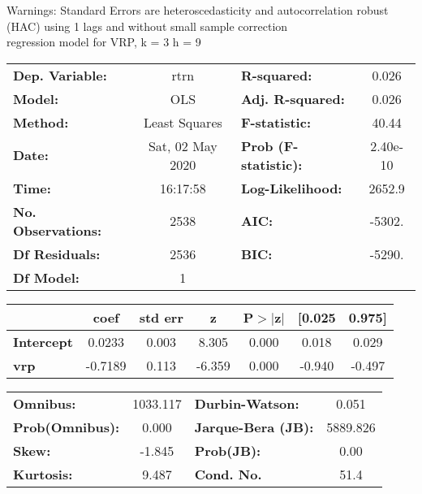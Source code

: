 Warnings: \newline
 [1] Standard Errors are heteroscedasticity and autocorrelation robust (HAC) using 1 lags and without small sample correction\\ 

regression model for VRP, k = 3 h = 9\begin{center}
\begin{tabular}{lclc}
\toprule
\textbf{Dep. Variable:}    &       rtrn       & \textbf{  R-squared:         } &     0.026   \\
\textbf{Model:}            &       OLS        & \textbf{  Adj. R-squared:    } &     0.026   \\
\textbf{Method:}           &  Least Squares   & \textbf{  F-statistic:       } &     40.44   \\
\textbf{Date:}             & Sat, 02 May 2020 & \textbf{  Prob (F-statistic):} &  2.40e-10   \\
\textbf{Time:}             &     16:17:58     & \textbf{  Log-Likelihood:    } &    2652.9   \\
\textbf{No. Observations:} &        2538      & \textbf{  AIC:               } &    -5302.   \\
\textbf{Df Residuals:}     &        2536      & \textbf{  BIC:               } &    -5290.   \\
\textbf{Df Model:}         &           1      & \textbf{                     } &             \\
\bottomrule
\end{tabular}
\begin{tabular}{lcccccc}
                   & \textbf{coef} & \textbf{std err} & \textbf{z} & \textbf{P$> |$z$|$} & \textbf{[0.025} & \textbf{0.975]}  \\
\midrule
\textbf{Intercept} &       0.0233  &        0.003     &     8.305  &         0.000        &        0.018    &        0.029     \\
\textbf{vrp}       &      -0.7189  &        0.113     &    -6.359  &         0.000        &       -0.940    &       -0.497     \\
\bottomrule
\end{tabular}
\begin{tabular}{lclc}
\textbf{Omnibus:}       & 1033.117 & \textbf{  Durbin-Watson:     } &    0.051  \\
\textbf{Prob(Omnibus):} &   0.000  & \textbf{  Jarque-Bera (JB):  } & 5889.826  \\
\textbf{Skew:}          &  -1.845  & \textbf{  Prob(JB):          } &     0.00  \\
\textbf{Kurtosis:}      &   9.487  & \textbf{  Cond. No.          } &     51.4  \\
\bottomrule
\end{tabular}
\end{center}


